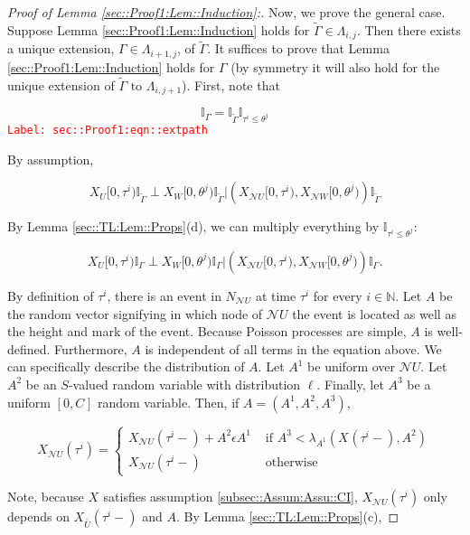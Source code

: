 \documentclass[12pt]{article}
\newcommand{\mb}{\mathbb}
\newcommand{\mc}{\mathcal}
\newcommand{\ov}{\overline}
\newcommand{\te}{\text}
\newcommand{\ep}{\epsilon}
\newcommand{\tr}{\textcolor{red}}
\newcommand{\labe}[1]{\tr{\texttt{Label: #1}}}
\newcommand{\ind}{\hspace{24pt}}
\newcommand{\neigh}{\mc{N}}					%
\renewcommand{\U}{U}							%
\newcommand{\UU}{W}								%
\renewcommand{\S}{S}							%
\newcommand{\ev}{\ep}							%
\newcommand{\cl}{\ov}							%
\newcommand{\poiss}[1]{N_{#1}}						%
\newcommand{\rt}[1]{\tau^{#1}}						%
\newcommand{\rtt}[1]{\theta^{#1}}					%
\newcommand{\itt}{i}								%
\newcommand{\ittt}{j}								%
\newcommand{\rxvt}[2]{X_{#1}{(#2)}}					%
\newcommand{\rxvts}[2]{X_{#1}{#2}}					%
\newcommand{\rate}[1]{\lambda_{#1}}					%
\newcommand{\const}[1]{C_{#1}}						%
\newcommand{\Sm}{\ell}								%
\newcommand{\alt}{\widetilde}						%
\newcommand{\apath}{\Gamma}						%
\newcommand{\pathset}[2]{\Lambda_{#1,#2}}			%
\newcommand{\rv}{A}								%
\begin{document}
\begin{proof}[Proof of Lemma \ref{sec::Proof1:Lem::Induction}:]
\ind Now, we prove the general case. Suppose Lemma \ref{sec::Proof1:Lem::Induction} holds for \(\alt{\apath} \in \pathset{\itt}{\ittt}\). Then there exists a unique extension, \(\apath \in \pathset{\itt+1}{\ittt}\), of \(\alt{\apath}\). It suffices to prove that Lemma \ref{sec::Proof1:Lem::Induction} holds for \(\apath\) (by symmetry it will also hold for the unique extension of \(\alt{\apath} \te{ to } \pathset{\itt}{\ittt+1}\)). First, note that

\begin{equation}
\mb{I}_{\apath} = \mb{I}_{\alt{\apath}}\mb{I}_{\rt{\itt} \leq \rtt{\ittt}}
\label{sec::Proof1:eqn::extpath}
\end{equation}
\labe{sec::Proof1:eqn::extpath}

By assumption,

\[\rxvts{\U}{[0,\rt{\itt})}\mb{I}_{\alt{\apath}}\perp \rxvts{\UU}{[0,\rtt{\ittt})}\mb{I}_{\alt{\apath}}|\left(\rxvts{\neigh{\U}}{[0,\rt{\itt})},\rxvts{\neigh{\UU}}{[0,\rtt{\ittt})}\right)\mb{I}_{\alt{\apath}}\]

By Lemma \ref{sec::TL:Lem::Props}(d), we can multiply everything by \(\mb{I}_{\rt{\itt} \leq \rtt{\ittt}}\):

\[\rxvts{\U}{[0,\rt{\itt})}\mb{I}_{\apath}\perp \rxvts{\UU}{[0,\rtt{\ittt})}\mb{I}_{\apath}|\left(\rxvts{\neigh{\U}}{[0,\rt{\itt})},\rxvts{\neigh{\UU}}{[0,\rtt{\ittt})}\right)\mb{I}_{\apath}.\]

By definition of \(\rt{\itt}\), there is an event in \(\poiss{\neigh{\U}}\) at time \(\rt{\itt}\) for every \(\itt \in \mb{ N}\). Let \(\rv\) be the random vector signifying in which node of \(\neigh{\U}\) the event is located as well as the height and mark of the event. Because Poisson processes are simple, \(\rv\) is well-defined. Furthermore, \(\rv\) is independent of all terms in the equation above. We can specifically describe the distribution of \(\rv\). Let \(\rv^1\) be uniform over \(\neigh{\U}\). Let \(\rv^2\) be an \(\S\)-valued random variable with distribution \(\Sm\). Finally, let \(\rv^3\) be a uniform \([0,\const{}]\) random variable. Then, if \(\rv=(\rv^1,\rv^2,\rv^3)\),

\[\rxvt{\neigh{\U}}{\rt{\itt}} = \begin{cases}
\rxvt{\neigh{\U}}{\rt{\itt}-} + \rv^2\ev{\rv^1} &\te{ if } \rv^3< \rate{\rv^1}(\rxvt{}{\rt{\itt}-}, \rv^2)\\
\rxvt{\neigh{\U}}{\rt{\itt}-} &\te{ otherwise}
\end{cases}\]

Note, because \(\rxvts{}{}\) satisfies assumption \ref{subsec::Assum:Assu::CI}, \(\rxvt{\neigh{\U}}{\rt{\itt}}\) only depends on \(\rxvt{\cl{\cl{\U}}}{\rt{\itt}-}\) and \(\rv\). By Lemma \ref{sec::TL:Lem::Props}(c), 


\end{proof}
\end{document}

